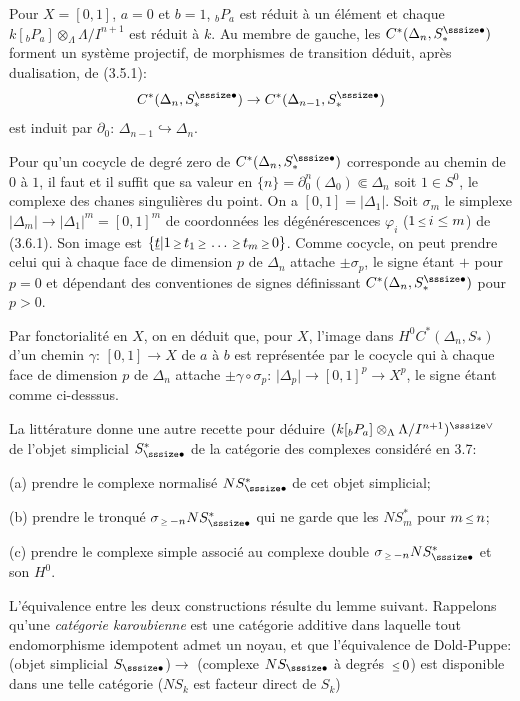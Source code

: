 Pour $X=[0,1]$, $a=0$ et $b=1$, ${}_b P_a$ est
r\'eduit \`a un \'el\'ement et chaque
$k[{}_bP_a]\otimes_\Lambda \Lambda/I^{n+1}$
est r\'eduit \`a $k$.
Au membre de gauche, les
$C^*(\Delta_n,S_*^{\smbul})$ forment un
syst\`eme projectif, de morphismes de
transition d\'eduit, apr\`es dualisation, de
(3.5.1\quad):
$$
C^*(\Delta_n,S_*^{\smbul})\to
C^*(\Delta_{n-1},
S_*^{\smbul})
$$
est induit par $\partial_0\colon\,\Delta_{n-1}
\hookrightarrow\Delta_n$.
\endexample

Pour qu'un cocycle de degr\'e zero de
$C^*(\Delta_n,S_*^{\smbul})$ corresponde au
chemin de $0$ \`a $1$, il faut et il suffit
que sa valeur en $\{n\}=\partial_0^n(\Delta_0)\Subset
\Delta_n$ soit $1\in S^0$, le complexe des
cha{\hati}nes singuli\`eres du point.
On a $[0,1]=\vert\Delta_1\vert$.
Soit $\sigma_m$ le simplexe
$\vert\Delta_m\vert
\to\vert\Delta_1\vert^m=[0,1]^m$ de
coordonn\'ees les d\'eg\'en\'erescences
$\varphi_i$ ($1\Le i\le m$) de (3.6.1).
Son image est $\{\underbart\vert 1\Ge
t_1\Ge\ldots\Ge t_m\Ge 0\}$.
Comme cocycle, on peut prendre celui qui \`a
chaque face de dimension $p$ de $\Delta_n$
attache $\pm\sigma_p$, le signe \'etant $+$
pour $p=0$ et d\'ependant des conventiones de
signes d\'efinissant
$C^*(\Delta_n,S_*^{\smbul})$ pour $p>0$.

Par fonctorialit\'e en $X$, on en d\'eduit
que, pour $X$, l'image dans
$H^0C^*(\Delta_n,S_*)$ d'un chemin
$\gamma\colon\, [0,1]\to X$ de $a$ \`a $b$ est
repr\'esent\'ee par le cocycle qui \`a chaque
face de dimension $p$ de $\Delta_n$ attache
$\pm\gamma\circ\sigma_p$:
$\vert\Delta_p\vert\to[0,1]^p\to X^p$, le
signe \'etant comme ci-desssus.

\endsubhead
La litt\'erature donne une autre recette pour
d\'eduire $(k[{}_bP_a]\otimes_\Lambda
\Lambda/I^{n+1})\upvee$ de l'objet simplicial
$S_{\smbul}^*$ de la cat\'egorie des complexes
consid\'er\'e en 3.7:

\medskip\noindent
{\sans (a)}\enspace
prendre le complexe normalis\'e
$NS_{\smbul}^*$ de cet objet simplicial;

\smallskip\noindent
{\sans (b)}\enspace
prendre le tronqu\'e $\sigma_{\Ge -n}
NS_{\smbul}^*$ qui ne garde que les
$NS_m^*$ pour $m\Le n$;

\smallskip\noindent
{\sans (c)}\enspace
prendre le complexe simple associ\'e au complexe
double $\sigma_{\Ge -n}NS_{\smbul}^*$ et son
$H^0$.

\medskip
L'\'equivalence entre les deux constructions
r\'esulte du lemme suivant.
Rappelons qu'une {\it cat\'egorie karoubienne}
est une cat\'egorie additive dans laquelle
tout endomorphisme idempotent admet un noyau,
et que l'\'equivalence de Dold-Puppe:
(objet simplicial
$S_{\smbul}$)$\to$ (complexe $NS_{\smbul}$ \`a
degr\'es $\Le 0$) est disponible dans une
telle cat\'egorie ($NS_k$ est facteur
direct de $S_k$)

